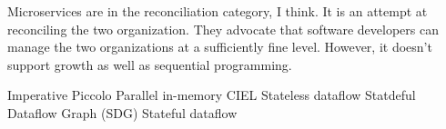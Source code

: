 Microservices are in the reconciliation category, I think.
It is an attempt at reconciling the two organization. 
They advocate that software developers can manage the two organizations at a sufficiently fine level.
However, it doesn't support growth as well as sequential programming.






Imperative
  Piccolo      Parallel in-memory \cite{Power2010}
  CIEL         Stateless dataflow \cite{Murray2011}
  Statdeful Dataflow Graph (SDG)          Stateful dataflow  \cite{Fernandez2014a}

